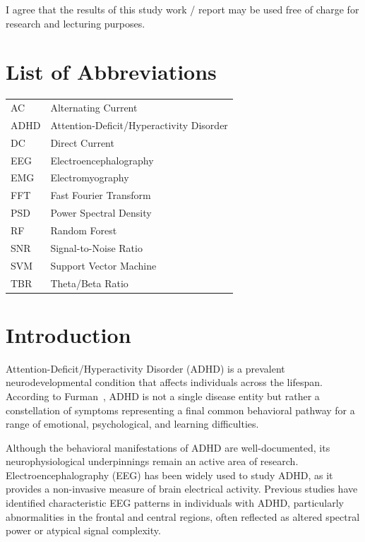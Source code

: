 \documentclass[11pt,a4paper]{article}
\begin{document}
I agree that the results of this study work / report may be used free of charge for research and lecturing purposes.

\newpage

\tableofcontents
\newpage

\section*{List of Abbreviations}
\begin{tabular}{ll}
    AC & Alternating Current \\
    ADHD & Attention-Deficit/Hyperactivity Disorder \\
    DC & Direct Current \\
    EEG & Electroencephalography \\
    EMG & Electromyography \\
    FFT & Fast Fourier Transform \\
    PSD & Power Spectral Density \\
    RF & Random Forest \\
    SNR & Signal-to-Noise Ratio \\
    SVM & Support Vector Machine \\
    TBR & Theta/Beta Ratio \\
\end{tabular}

\newpage

\section{Introduction}\label{sec:Introduction}
Attention-Deficit/Hyperactivity Disorder (ADHD) is a prevalent neurodevelopmental condition that affects individuals across the lifespan. 
According to Furman~\cite{furman2005attention}, ADHD is not a single disease entity but rather a constellation of symptoms representing a 
final common behavioral pathway for a range of emotional, psychological, and learning difficulties. 

Although the behavioral manifestations of ADHD are well-documented, its neurophysiological underpinnings remain an active area of research. 
Electroencephalography (EEG) has been widely used to study ADHD, as it provides a non-invasive measure of brain electrical activity. 
Previous studies have identified characteristic EEG patterns in individuals with ADHD, particularly abnormalities in the frontal and central 
regions, often reflected as altered spectral power or atypical signal complexity. 
\end{document}
